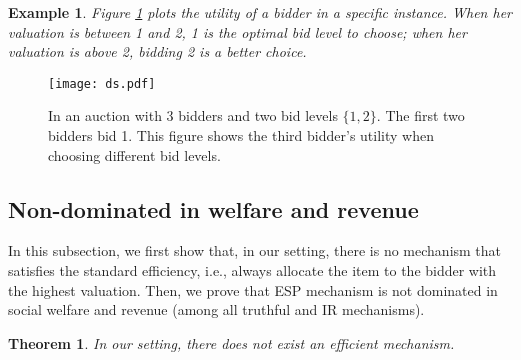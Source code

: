 \documentclass[letterpaper]{article}
\newtheorem{theorem}{Theorem}%
\newtheorem{example}{Example}
\begin{document}
\begin{example}
	Figure \ref{fig:ds} plots the utility of a bidder in a specific instance. When her valuation is between 1 and 2, 1 is the optimal bid level to choose; when her valuation is above 2, bidding 2 is a better choice.
\end{example}
\begin{figure}
	\centering
	\texttt{[image: ds.pdf]}\\
	\caption{In an auction with 3 bidders and two bid levels $\{1,2\}$. The first two bidders bid 1. This figure shows the third bidder's utility when choosing different bid levels.}\label{fig:ds}
\end{figure}

\subsection{Non-dominated in welfare and revenue}

In this subsection, we first show that, in our setting, there is no mechanism that satisfies the standard efficiency, i.e., always allocate the item to the bidder with the highest valuation.
Then, we prove that ESP mechanism is not dominated in social welfare and revenue (among all truthful and IR mechanisms).

\begin{theorem}\label{thm:ne}
	In our setting, there does not exist an efficient mechanism.
\end{theorem}
\end{document}
